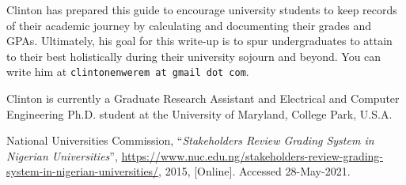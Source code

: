 \documentclass[letter]{article}
\begin{document}

Clinton has prepared this guide to encourage university students to keep records of their academic journey by calculating and documenting their grades and GPAs. Ultimately, his goal for this write-up is to spur undergraduates to attain to their best holistically during their university sojourn and beyond. You can write him at \texttt{clintonenwerem at gmail dot com}.

Clinton is currently a Graduate Research Assistant and Electrical and Computer Engineering Ph.D. student at the University of Maryland, College Park, U.S.A.
\renewcommand\refname{\sffamily Reference}
\lhead{}
\rhead{}
\begin{thebibliography}{}
	National Universities Commission,
	``\textit{Stakeholders Review Grading System in Nigerian Universities}'',
	\url{https://www.nuc.edu.ng/stakeholders-review-grading-system-in-nigerian-universities/},
	2015,
	[Online]. Accessed 28-May-2021.
\end{thebibliography}
\end{document}
